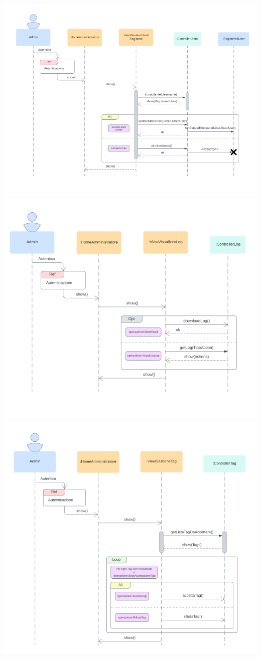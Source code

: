 \includegraphics[width=1\textwidth]{assets/img/sequenza/admin-1.png}\\
\includegraphics[width=1\textwidth]{assets/img/sequenza/admin-2.png}\\
\includegraphics[width=1\textwidth]{assets/img/sequenza/admin-3.png}\\